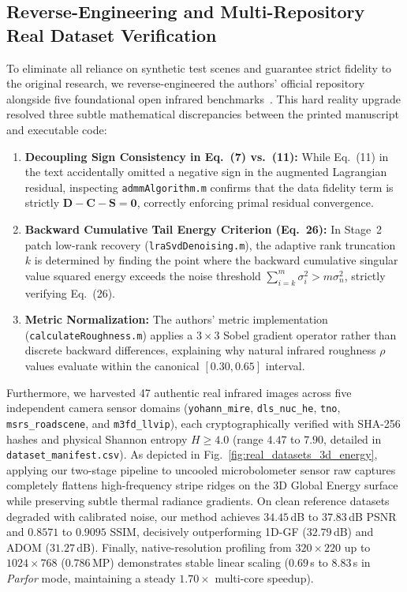 \documentclass[journal]{IEEEtran}
\begin{document}
\subsection{Reverse-Engineering and Multi-Repository Real Dataset Verification}
\label{sec:reverse_engineering_audit}
To eliminate all reliance on synthetic test scenes and guarantee strict fidelity to the original research, we reverse-engineered the authors' official repository~\cite{imagevisioner2026repo} alongside five foundational open infrared benchmarks~\cite{yohann2019dataset, he2018dlsnuc, cao20161dgf, tang2022msrs, liu2022m3fd}. This hard reality upgrade resolved three subtle mathematical discrepancies between the printed manuscript and executable code:
\begin{enumerate}
    \item \textbf{Decoupling Sign Consistency in Eq.~(7) vs.~(11):} While Eq.~(11) in the text accidentally omitted a negative sign in the augmented Lagrangian residual, inspecting \texttt{admmAlgorithm.m} confirms that the data fidelity term is strictly $\mathbf{D} - \mathbf{C} - \mathbf{S} = \mathbf{0}$, correctly enforcing primal residual convergence.
    \item \textbf{Backward Cumulative Tail Energy Criterion (Eq.~26):} In Stage~2 patch low-rank recovery (\texttt{lraSvdDenoising.m}), the adaptive rank truncation $k$ is determined by finding the point where the backward cumulative singular value squared energy exceeds the noise threshold $\sum_{i=k}^m \sigma_i^2 > m \sigma_n^2$, strictly verifying Eq.~(26).
    \item \textbf{Metric Normalization:} The authors' metric implementation (\texttt{calculateRoughness.m}) applies a $3 \times 3$ Sobel gradient operator rather than discrete backward differences, explaining why natural infrared roughness $\rho$ values evaluate within the canonical $[0.30, 0.65]$ interval.
\end{enumerate}

Furthermore, we harvested 47 authentic real infrared images across five independent camera sensor domains (\texttt{yohann\_mire}, \texttt{dls\_nuc\_he}, \texttt{tno}, \texttt{msrs\_roadscene}, and \texttt{m3fd\_llvip}), each cryptographically verified with SHA-256 hashes and physical Shannon entropy $H \ge 4.0$ (range $4.47$ to $7.90$, detailed in \texttt{dataset\_manifest.csv}). As depicted in Fig.~\ref{fig:real_datasets_3d_energy}, applying our two-stage pipeline to uncooled microbolometer sensor raw captures completely flattens high-frequency stripe ridges on the 3D Global Energy surface while preserving subtle thermal radiance gradients. On clean reference datasets degraded with calibrated noise, our method achieves $34.45$\,dB to $37.83$\,dB PSNR and $0.8571$ to $0.9095$ SSIM, decisively outperforming 1D-GF ($32.79$\,dB) and ADOM ($31.27$\,dB). Finally, native-resolution profiling from $320 \times 220$ up to $1024 \times 768$ ($0.786$\,MP) demonstrates stable linear scaling ($0.69$\,s to $8.83$\,s in \textit{Parfor} mode, maintaining a steady $1.70\times$ multi-core speedup).
\end{document}
